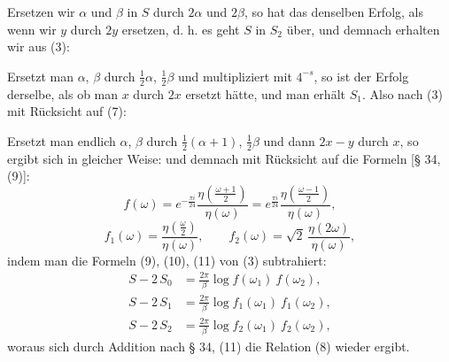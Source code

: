 
Ersetzen wir $\alpha$ und $\beta$ in $S$ durch $2\alpha$ und $2\beta$, so hat das
denselben Erfolg, als wenn wir $y$ durch $2y$ ersetzen, d. h. es
geht $S$ in $S_2$ über, und demnach erhalten wir aus (3):

Ersetzt man $\alpha$, $\beta$ durch $\frac12\alpha$, $\frac12\beta$ und multipliziert mit $4^{-s}$, so
ist der Erfolg derselbe, als ob man $x$ durch $2x$ ersetzt hätte, und
man erhält $S_1$. Also nach (3) mit Rücksicht auf (7):

Ersetzt man endlich $\alpha$, $\beta$ durch $\frac12(\alpha+1)$, $\frac12\beta$ und dann
$2x-y$ durch $x$, so ergibt sich in gleicher Weise:
und demnach mit Rücksicht auf die Formeln [§ 34, (9)]:
\[
f(\omega) = e^{-\frac{\pi i}{24}}\frac{\eta\left(\frac{\omega+1}{2}\right)}{\eta(\omega)}
= e^{\frac{\pi i}{24}}\frac{\eta\left(\frac{\omega-1}{2}\right)}{\eta(\omega)},
\]
\[
f_1(\omega) = \frac{\eta\left(\frac{\omega}{2}\right)}{\eta(\omega)}, \qquad
f_2(\omega) = \sqrt{2}\,\frac{\eta(2\omega)}{\eta(\omega)},
\]
indem man die Formeln (9), (10), (11) von (3) subtrahiert:
\[
\begin{aligned}
S - 2\,S_0 &= \frac{2\pi}{\beta}\log f(\omega_1)\ f(\omega_2), \\
S - 2\,S_1 &= \frac{2\pi}{\beta}\log f_1(\omega_1)\ f_1(\omega_2), \\
S - 2\,S_2 &= \frac{2\pi}{\beta}\log f_2(\omega_1)\ f_2(\omega_2),
\end{aligned}
\]
woraus sich durch Addition nach § 34, (11) die Relation (8) wieder
ergibt.
